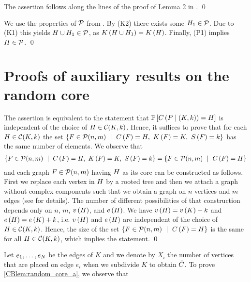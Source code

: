 The assertion follows along the lines of the proof of Lemma 2 in \cite{KangLuczak2012}. \qed

We use the properties of $\mathcal{P}$ from . By (K2) there exists some $H_1 \in \mathcal{P}$. Due to (K1) this yields $H \cup H_1 \in \mathcal{P}$, as $K\left(H\cup H_1\right)=K\left(H\right)$. Finally, (P1) implies $H \in \mathcal{P}$. \qed

\section{Proofs of auxiliary results on the random core}\label{CBsec:proofs_aux2}
The assertion is equivalent to the statement that $\mathbb{P}\left[C\left(P \mid \left(K, k\right)\right)=H\right]$ is independent of the choice of $H\in \mathcal{C}(K,k)$. Hence, it suffices to prove that for each $H\in \mathcal{C}(K,k)$ the set $\left\{F\in \planarClass(n,m) \ \mid\ \core{F}=\fixGraph,\ \kernel{F}=K,\ \subdivisionNumber{F}=\nd\right\}$ has the same number of elements. We observe that 
\begin{align*}
\left\{F\in \planarClass(n,m) \ \mid\ \core{F}=\fixGraph,\ \kernel{F}=K,\ \subdivisionNumber{F}=\nd\right\}=\left\{F\in \planarClass(n,m) \ \mid\ \core{F}=\fixGraph\right\}    
\end{align*}
and each graph $F\in \mathcal{P}(n,m)$ having $H$ as its core can be constructed as follows. First we replace each vertex in $H$ by a rooted tree and then we attach a graph without complex components such that we obtain a graph on $n$ vertices and $m$ edges (see \cite[Section 3]{KangMosshammerSpruessel2020} for details). The number of different possibilities of that construction depends only on $n$, $m$, $v\left({H}\right)$, and $e\left({H}\right)$. We have $v\left({H}\right)=v\left({K}\right)+k$ and $e\left({H}\right)=e\left({K}\right)+k$, i.e. $v\left({H}\right)$ and $e\left({H}\right)$ are independent of the choice of $H\in \mathcal{C}(K,k)$. Hence, the size of the set $\left\{F\in \planarClass(n,m) \ \mid\ \core{F}=\fixGraph\right\}$ is the same for all $H\in \mathcal{C}(K,k)$, which implies the statement.
\qed

Let $e_1, \ldots, e_N$ be the edges of $K$ and we denote by $X_i$ the number of vertices that are placed on edge $e_i$ when we subdivide $K$ to obtain $\tilde{C}$. To prove \ref{CBlem:random_core_a}, we observe that 

